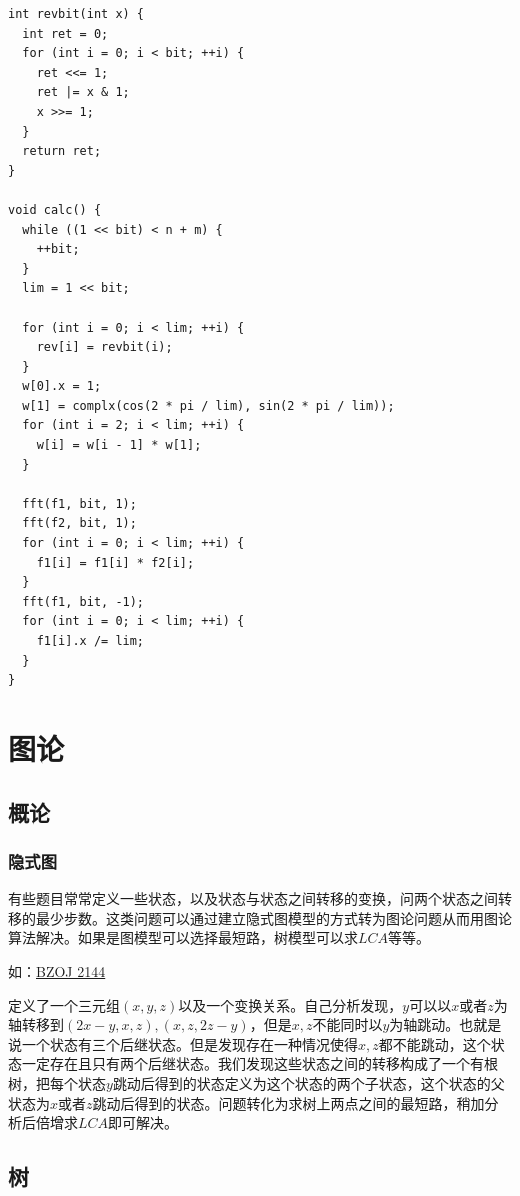 \documentclass[11pt]{article}
\begin{document}
\begin{enumerate}
\begin{enumerate}
\begin{verbatim}
int revbit(int x) {
  int ret = 0;
  for (int i = 0; i < bit; ++i) {
    ret <<= 1;
    ret |= x & 1;
    x >>= 1;
  }
  return ret;
}

void calc() {
  while ((1 << bit) < n + m) {
    ++bit;
  }
  lim = 1 << bit;

  for (int i = 0; i < lim; ++i) {
    rev[i] = revbit(i);
  }
  w[0].x = 1;
  w[1] = complx(cos(2 * pi / lim), sin(2 * pi / lim));
  for (int i = 2; i < lim; ++i) {
    w[i] = w[i - 1] * w[1];
  }

  fft(f1, bit, 1);
  fft(f2, bit, 1);
  for (int i = 0; i < lim; ++i) {
    f1[i] = f1[i] * f2[i];
  }
  fft(f1, bit, -1);
  for (int i = 0; i < lim; ++i) {
    f1[i].x /= lim;
  }
}
\end{verbatim}
\end{enumerate}
\end{enumerate}

\section{图论}
\label{sec:org3246567}
\subsection{概论}
\label{sec:org3ccc9fb}
\subsubsection{隐式图}
\label{sec:orgd9ac18b}

有些题目常常定义一些状态，以及状态与状态之间转移的变换，问两个状态之间转移的最少步数。这类问题可以通过建立隐式图模型的方式转为图论问题从而用图论算法解决。如果是图模型可以选择最短路，树模型可以求\(LCA\)等等。

如：\href{http://www.lydsy.com/JudgeOnline/problem.php?id=2144}{BZOJ 2144}

定义了一个三元组\((x,y,z)\)以及一个变换关系。自己分析发现，\(y\)可以以\(x\)或者\(z\)为轴转移到\((2x-y,x,z),(x,z,2z-y)\)，但是\(x,z\)不能同时以\(y\)为轴跳动。也就是说一个状态有三个后继状态。但是发现存在一种情况使得\(x,z\)都不能跳动，这个状态一定存在且只有两个后继状态。我们发现这些状态之间的转移构成了一个有根树，把每个状态\(y\)跳动后得到的状态定义为这个状态的两个子状态，这个状态的父状态为\(x\)或者\(z\)跳动后得到的状态。问题转化为求树上两点之间的最短路，稍加分析后倍增求\(LCA\)即可解决。

\subsection{树}
\label{sec:orgeb46cd3}
\end{document}
